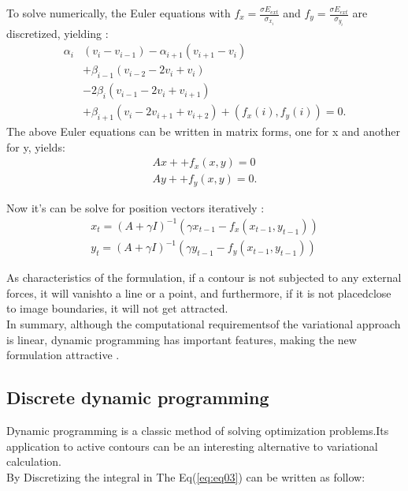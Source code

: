 \hspace{-0.6cm}To solve numerically, the Euler equations with $f_x =\frac{\sigma E_{ext}}{\sigma_{x_i}}$ 
and $f_y =\frac{\sigma E_{ext}}{\sigma_{y_i}}$ are discretized, yielding :\\
\begin{equation}
        \begin{aligned}
                \alpha_i & (v_i - v_{i-1}) - \alpha_{i+1} (v_{i+1} - v_i) \\
                 & + \beta_{i-1}(v_{i-2} - 2v_i + v_i ) \\
                 & - 2 \beta_i (v_{i-1} -2v_i + v_{i+1}) \\
                 & + \beta_{i+1} (v_i -2v_{i+1} + v_{i+2}) + (f_x(i),f_y(i)) = 0.
        \end{aligned}
        \label{eq:eq09}
\end{equation}
The above Euler equations can be written in matrix forms, one for x and
another for y, yields:
\begin{equation}
        \begin{matrix}
                Ax + + f_x(x,y) = 0 \\
                Ay + + f_y(x,y) = 0.
        \end{matrix}
        \label{eq:eq10}
\end{equation}

\hspace{-0.6cm}Now it's can be solve for position vectors iteratively :
\begin{equation}
        \begin{matrix}
                x_t = (A + \gamma I)^{-1} (\gamma x_{t-1} - f_x(x_{t-1}, y_{t-1})) \\
                y_t = (A + \gamma I)^{-1} (\gamma y_{t-1} - f_y(x_{t-1}, y_{t-1}))
        \end{matrix}
        \label{eq:eq11}
\end{equation}

\hspace{-0.6cm}As characteristics of the formulation, if a contour is not subjected to any
external forces, it will vanishto a line or a point, and furthermore, if it is not
placedclose to image boundaries, it will not get attracted.\\
In summary, although the computational requirementsof the variational
approach is linear, dynamic programming has important features, making the
new formulation attractive \cite{2.6}.
\subsection{Discrete dynamic programming}\label{subsec:discrete-dynamic-programming}
Dynamic programming is a classic method of solving optimization problems.Its
application to active contours can be an interesting alternative to variational
calculation.\\
By Discretizing the integral in The Eq(\ref{eq:eq03}) can be written as follow\cite{2.6}:


